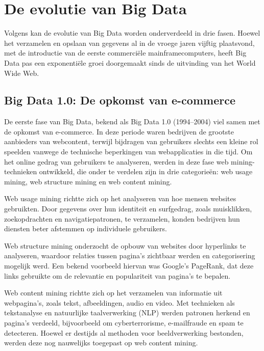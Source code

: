 \section{De evolutie van Big Data}  

Volgens \textcite{Lee2017} kan de evolutie van Big Data worden onderverdeeld in drie fasen. Hoewel het verzamelen en opslaan van gegevens al in de vroege jaren vijftig plaatsvond, met de introductie van de eerste commerciële mainframecomputers, heeft Big Data pas een exponentiële groei doorgemaakt sinds de uitvinding van het World Wide Web.


\subsection{Big Data 1.0: De opkomst van e-commerce}  

De eerste fase van Big Data, bekend als Big Data 1.0 (1994–2004) viel samen met de opkomst van e-commerce. In deze periode waren bedrijven de grootste aanbieders van webcontent, terwijl bijdragen van gebruikers slechts een kleine rol speelden vanwege de technische beperkingen van webapplicaties in die tijd. Om het online gedrag van gebruikers te analyseren, werden in deze fase web mining-technieken ontwikkeld, die onder te verdelen zijn in drie categorieën: web usage mining, web structure mining en web content mining.

\vspace{1 em}

Web usage mining richtte zich op het analyseren van hoe mensen websites gebruikten. Door gegevens over hun identiteit en surfgedrag, zoals muisklikken, zoekopdrachten en navigatiepatronen, te verzamelen, konden bedrijven hun diensten beter afstemmen op individuele gebruikers.

\vspace{1 em}

Web structure mining onderzocht de opbouw van websites door hyperlinks te analyseren, waardoor relaties tussen pagina’s zichtbaar werden en categorisering mogelijk werd. Een bekend voorbeeld hiervan was Google’s PageRank, dat deze links gebruikte om de relevantie en populariteit van pagina’s te bepalen.

\vspace{1 em}

Web content mining richtte zich op het verzamelen van informatie uit webpagina’s, zoals tekst, afbeeldingen, audio en video. Met technieken als tekstanalyse en natuurlijke taalverwerking (NLP) werden patronen herkend en pagina’s verdeeld, bijvoorbeeld om cyberterrorisme, e-mailfraude en spam te detecteren. Hoewel er destijds al methoden voor beeldverwerking bestonden, werden deze nog nauwelijks toegepast op web content mining.


